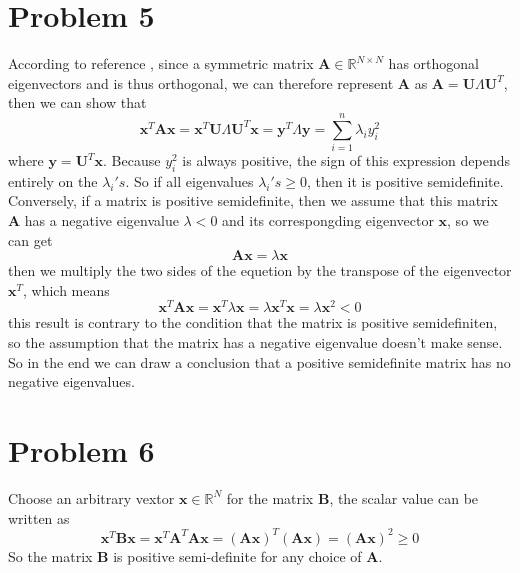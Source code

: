 \documentclass{article}
\begin{document}
\section*{Problem 5}
According to reference \cite{strang09}, since a symmetric matrix $\bm{A} \in \mathbb{R}^{N \times N}$ has orthogonal eigenvectors and is thus orthogonal, we can therefore represent $\bm{A}$ as $\bm{A}=\bm{U}\varLambda \bm{U}^T$, then we can show that
\[ \bm{x}^T\bm{A}\bm{x} = \bm{x}^T\bm{U}\varLambda \bm{U}^T\bm{x} = \bm{y}^T\varLambda \bm{y} = \sum_{i=1}^{n}\lambda_i y_i^2\]
where $\bm{y}=\bm{U}^T\bm{x}$. Because $y_i^2$ is always positive, the sign of this expression depends entirely on the $\lambda_i's$. So if all eigenvalues $\lambda_i's \geq 0$, then it is positive semidefinite.\\

Conversely, if a matrix is positive semidefinite, then we assume that this matrix $\bm{A}$ has a negative eigenvalue $\lambda < 0$ and its correspongding eigenvector $\bm{x}$, so we can get
\[ \bm{Ax}=\lambda \bm{x} \]
then we multiply the two sides of the equetion by the transpose of the eigenvector $\bm{x}^T$, which means
\[ \bm{x}^T\bm{Ax} = \bm{x}^T \lambda \bm{x} = \lambda \bm{x}^T\bm{x} = \lambda\bm{x}^2 < 0\]
this result is contrary to the condition that the matrix is positive semidefiniten, so the assumption that the matrix has a negative eigenvalue doesn't make sense. So in the end we can draw a conclusion that a positive semidefinite matrix has no negative eigenvalues.

\section*{Problem 6}
Choose an arbitrary vextor $\bm{x} \in \mathbb{R}^N $ for the matrix $\bm{B}$, the scalar value can be written as
\[ \bm{x}^T\bm{B}\bm{x} = \bm{x}^T\bm{A}^T\bm{A}\bm{x} = (\bm{A}\bm{x})^T(\bm{A}\bm{x}) = (\bm{A}\bm{x})^2 \geq 0 \]
So the matrix $\bm{B}$ is positive semi-definite for any choice of $\bm{A}$.
\end{document}
